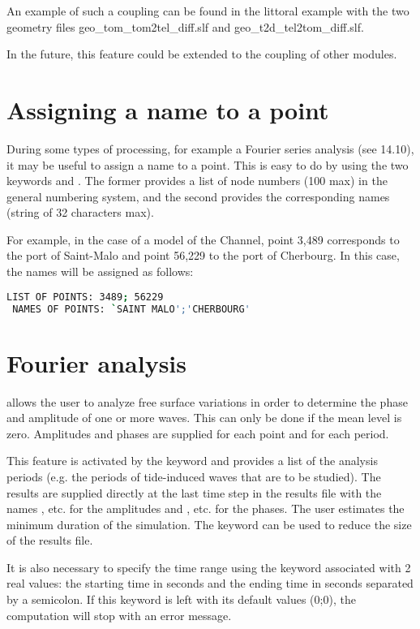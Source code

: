 An example of such a coupling can be found in the littoral \gaia example with
the two geometry files geo\_tom\_tom2tel\_diff.slf and
geo\_t2d\_tel2tom\_diff.slf.

In the future, this feature could be extended to the coupling of other modules.


\section{Assigning a name to a point}

During some types of processing, for example a Fourier series analysis
(see 14.10),
it may be useful to assign a name to a point.
This is easy to do by using the two keywords 
and .
The former provides a list of node numbers (100 max) in the general numbering
system,
and the second provides the corresponding names (string of 32 characters max).

For example, in the case of a model of the Channel, point 3,489 corresponds
to the port of Saint-Malo and point 56,229 to the port of Cherbourg.
In this case, the names will be assigned as follows:
\begin{lstlisting}[language=bash]
 LIST OF POINTS: 3489; 56229
 NAMES OF POINTS: `SAINT MALO';'CHERBOURG'
\end{lstlisting}

\section{Fourier analysis}

 allows the user to analyze free surface variations
in order to determine the phase and amplitude of one or more waves.
This can only be done if the mean level is zero.
Amplitudes and phases are supplied for each point and for each period.

This feature is activated by the keyword  and
provides a list of the analysis periods (e.g. the periods of tide-induced waves
that are to be studied).
The results are supplied directly at the last time step in the results file with
the names ,  etc. for the amplitudes
and ,  etc. for the phases.
The user estimates the minimum duration of the simulation.
The keyword 
can be used to reduce the size of the results file.

It is also necessary to specify the time range using the keyword
 associated with 2 real values:
the starting time in seconds and the ending time in seconds separated by a
semicolon.
If this keyword is left with its default values (0;0),
the computation will stop with an error message.

